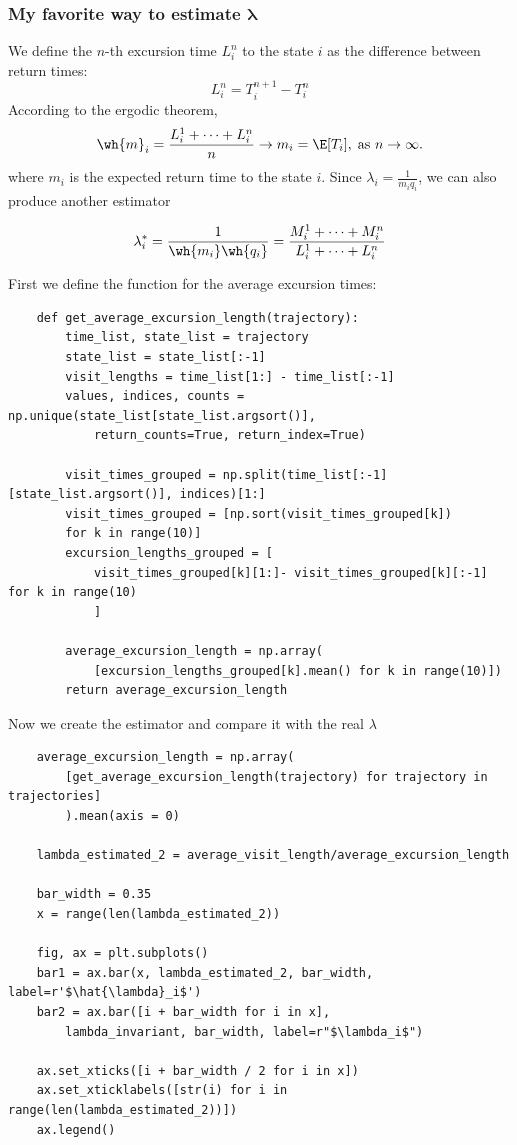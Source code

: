 \subsubsection*{My favorite way to estimate $\boldsymbol{\lambda}$}

We define the $n$-th excursion time $L_i^n$ to the state $i$ as the difference between return times:
\[ L^n_i = T_i^{n+1} - T_i^{n} \]
According to the ergodic theorem,
\[ \wh{m}_i = \frac{L^1_i + \cdots + L^n_i}{n} \to m_i = \E[T_i],\; \hbox{as }n\to\infty. \]
where $m_i$ is the expected return time to the state $i$. Since $\lambda_i = \frac{1}{m_i q_i}$, we can also produce another estimator

\[ \lambda^*_i = \frac{1}{\wh{m_i} \wh{q_i}} = \frac{M^1_i + \cdots + M^n_i}{L^1_i + \cdots + L^n_i} \]

First we define the function for the average excursion times:
\begin{verbatim}
    def get_average_excursion_length(trajectory):
        time_list, state_list = trajectory
        state_list = state_list[:-1]
        visit_lengths = time_list[1:] - time_list[:-1]
        values, indices, counts = np.unique(state_list[state_list.argsort()],
            return_counts=True, return_index=True)

        visit_times_grouped = np.split(time_list[:-1][state_list.argsort()], indices)[1:] 
        visit_times_grouped = [np.sort(visit_times_grouped[k])
        for k in range(10)]
        excursion_lengths_grouped = [
            visit_times_grouped[k][1:]- visit_times_grouped[k][:-1] for k in range(10)
            ]

        average_excursion_length = np.array(
            [excursion_lengths_grouped[k].mean() for k in range(10)])
        return average_excursion_length
\end{verbatim}

Now we create the estimator and compare it with the real $\lambda$

\begin{verbatim}
    average_excursion_length = np.array(
        [get_average_excursion_length(trajectory) for trajectory in trajectories]
        ).mean(axis = 0)

    lambda_estimated_2 = average_visit_length/average_excursion_length
    
    bar_width = 0.35
    x = range(len(lambda_estimated_2))
    
    fig, ax = plt.subplots()
    bar1 = ax.bar(x, lambda_estimated_2, bar_width, label=r'$\hat{\lambda}_i$')
    bar2 = ax.bar([i + bar_width for i in x],
        lambda_invariant, bar_width, label=r"$\lambda_i$")
    
    ax.set_xticks([i + bar_width / 2 for i in x])
    ax.set_xticklabels([str(i) for i in range(len(lambda_estimated_2))])
    ax.legend()
\end{verbatim}

